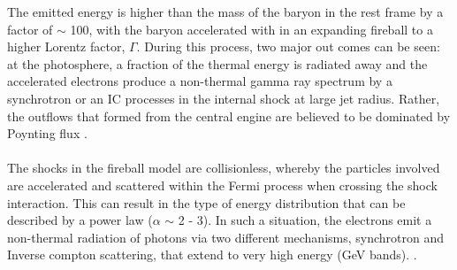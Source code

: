 The  emitted  energy  is  higher than  the  mass of  the baryon in the rest frame by a factor of  $\sim $ 100, with  the  baryon  accelerated  with in an expanding fireball to a higher Lorentz factor, $\Gamma $. During this process, two major out comes can be seen: at the photosphere, a fraction of the thermal energy is radiated away  and  the  accelerated  electrons  produce  a non-thermal  gamma ray spectrum by a synchrotron  or an IC  processes in the  internal shock at large jet radius. Rather, the outflows that formed  from the central engine are believed to be dominated by Poynting flux \citep{15}\citep{16}.\\\\
The shocks in the fireball model are collisionless, whereby the particles involved are accelerated and scattered within the Fermi process when crossing the shock interaction. This can result in the type of energy distribution that can be described by a power law ($ \alpha $  $ \sim $ 2 - 3). In such a situation, the electrons emit a non-thermal radiation of photons via two different mechanisms, synchrotron and Inverse compton scattering, that extend to very high energy (GeV bands). \citep{10} \citep{17}. 
